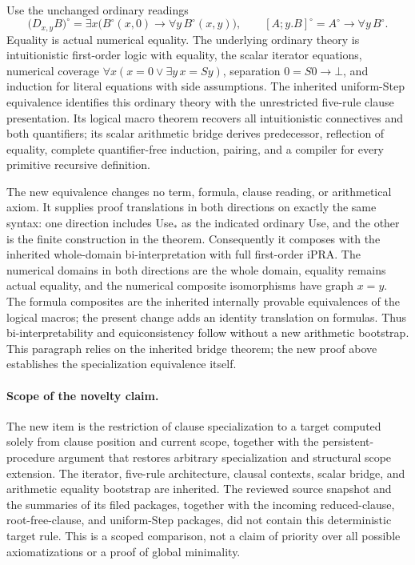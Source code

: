 \documentclass[11pt,letterpaper]{article}
\theoremstyle{definition}
\begin{document}
Use the unchanged ordinary readings
\[
 \bigl(D_{x,y}B\bigr)^\circ
   =\exists x\bigl(B^\circ(x,0)\to\forall y\,B^\circ(x,y)\bigr),
 \qquad
 [A;y.B]^\circ=A^\circ\to\forall y\,B^\circ.
\]
Equality is actual numerical equality.  The underlying ordinary theory is
intuitionistic first-order logic with equality, the scalar iterator
equations, numerical coverage
\(\forall x(x=0\lor\exists y\,x=Sy)\), separation \(0=S0\to\bot\),
and induction for literal equations with side assumptions.  The inherited
uniform-Step equivalence identifies this ordinary theory with the
unrestricted five-rule clause presentation.  Its logical macro theorem
recovers all intuitionistic connectives and both quantifiers; its scalar
arithmetic bridge derives predecessor, reflection of equality, complete
quantifier-free induction, pairing, and a compiler for every primitive
recursive definition.

The new equivalence changes no term, formula, clause reading, or
arithmetical axiom.  It supplies proof translations in both directions on
exactly the same syntax: one direction includes Use$_*$ as the indicated
ordinary Use, and the other is the finite construction in the theorem.
Consequently it composes with the inherited whole-domain bi-interpretation
with full first-order iPRA.  The numerical domains in both directions are
the whole domain, equality remains actual equality, and the numerical
composite isomorphisms have graph \(x=y\).  The formula composites are
the inherited internally provable equivalences of the logical macros;
the present change adds an identity translation on formulas.  Thus
bi-interpretability and equiconsistency follow without a new arithmetic
bootstrap.  This paragraph relies on the inherited bridge theorem; the
new proof above establishes the specialization equivalence itself.

\paragraph{Scope of the novelty claim.}
The new item is the restriction of clause specialization to a target
computed solely from clause position and current scope, together with
the persistent-procedure argument that restores arbitrary specialization
and structural scope extension.  The iterator, five-rule architecture,
clausal contexts, scalar bridge, and arithmetic equality bootstrap are
inherited.  The reviewed source snapshot and the summaries of its filed
packages, together with the incoming reduced-clause, root-free-clause,
and uniform-Step packages, did not contain this deterministic target rule.
This is a scoped comparison, not a claim of priority over all possible
axiomatizations or a proof of global minimality.
\end{document}
